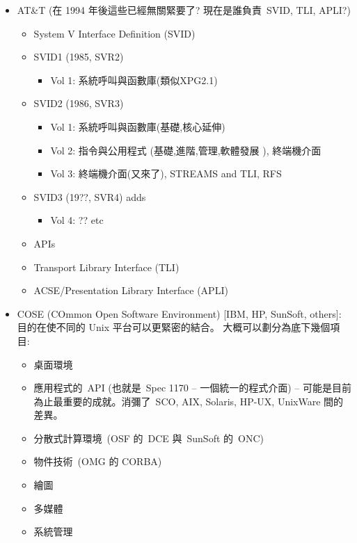 \documentclass{article}
\begin{document}
\begin{CJK*}{Bg5}{ming}
\begin{itemize}
      \item AT\&T
        (在 1994 年後這些已經無關緊要了? 現在是誰負責~SVID, TLI, APLI?)
	\begin{itemize}
        \item System V Interface Definition (SVID)
          \item SVID1 (1985, SVR2)
	  \begin{itemize}
            \item Vol 1:  系統呼叫與函數庫(類似XPG2.1)
	  \end{itemize}
          \item SVID2 (1986, SVR3)
	  \begin{itemize}
            \item Vol 1:  系統呼叫與函數庫(基礎,核心延伸)
            \item Vol 2:  指令與公用程式 (基礎,進階,管理,軟體發展
                    ), 終端機介面
            \item Vol 3:  終端機介面(又來了), STREAMS and TLI, RFS
	  \end{itemize}
          \item SVID3 (19??, SVR4) adds
	  \begin{itemize}
            \item Vol 4:  ??  etc
	  \end{itemize}
	\end{itemize}
	\begin{itemize}
        \item APIs
          \item Transport Library Interface (TLI)
          \item ACSE/Presentation Library Interface (APLI)
	\end{itemize}

      \item COSE (COmmon Open Software Environment) [IBM, HP, SunSoft, others]:
        目的在使不同的 Unix 平台可以更緊密的結合。
        大概可以劃分為底下幾個項目:
	\begin{itemize}
          \item 桌面環境
          \item 應用程式的~API (也就是~Spec 1170 -- 一個統一的程式介面) --
          可能是目前為止最重要的成就。消彌了~SCO, AIX, Solaris,
          HP-UX, UnixWare 間的差異。
          \item 分散式計算環境~(OSF 的~DCE 與~SunSoft 的~ONC)
          \item 物件技術~(OMG 的 CORBA)
          \item 繪圖
          \item 多媒體
          \item 系統管理
	\end{itemize}


\end{itemize}
\end{CJK*}
\end{document}
